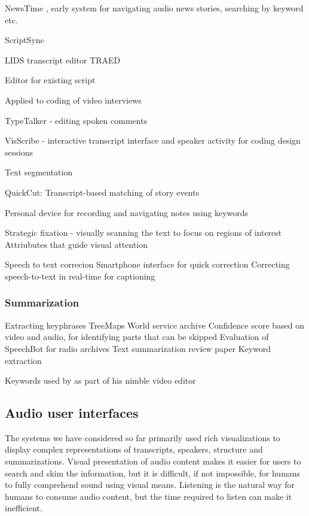 NewsTime \citep{Horner1993}, early system for navigating audio news stories, searching by keyword etc.

ScriptSync \citep{Avid2011}

LIDS transcript editor \citep{Apperley2002}
TRAED \citep{Masoodian2006}

Editor for existing script \citep{Shin2016}

Applied to coding of video interviews \cite{Chandrasegaran2017}

TypeTalker - editing spoken comments \citep{Arawjo2017}

VisScribe - interactive transcript interface and speaker activity for coding design sessions \cite{Chandrasegaran2017}

Text segmentation \citep{Choi2000}

QuickCut: Transcript-based matching of story events \citep{Truong2016}

Personal device for recording and navigating notes using keywords \citep{Tucker2003}

Strategic fixation - visually scanning the text to focus on regions of interest \citep{Whittaker2007}
Attriubutes that guide visual attention \citep{Wolfe2004}

Speech to text correcion 
\citep{Burke2006}
\citep{Liang2014}
\citep{Suhm2001}
\citep{Wald2007}
Smartphone interface for quick correction \citep{Liang2014}
Correcting speech-to-text in real-time for captioning \citep{Wald2007}

\subsubsection{Summarization}

Extracting keyphrases \citep{Inkpen2004}
TreeMaps \citep{Abdulhamid2013,Abdulhamid2013a}
World service archive \citep{Raimond2014}
Confidence score based on video and audio, for identifying parts that can be skipped \citep{Foote1998}
Evaluation of SpeechBot for radio archives \citep{Kim2003}
Text summarization review paper \citep{Lloret2012}
Keyword extraction \citep{Matsuo2004}

Keywords used by \citet{Loviscach2011a} as part of his nimble video editor

\subsection{Audio user interfaces}

The systems we have considered so far primarily used rich visualizations to display complex representations of
transcripts, speakers, structure and summarizations. Visual presentation of audio content makes it easier for users to
search and skim the information, but it is difficult, if not impossible, for humans to fully comprehend sound using
visual means. Listening is the natural way for humans to consume audio content, but the time required to listen can
make it inefficient.

